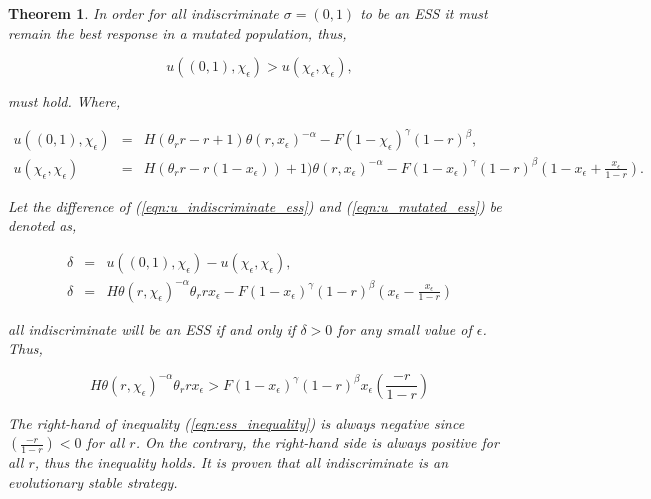 \documentclass[10pt]{article}
\newtheorem{theorem}{Theorem}
\begin{document}
\begin{theorem}
	In order for all indiscriminate \(\sigma=(0,1)\) to be an ESS it must
	remain the best response in a mutated population, thus,

	\begin{equation}\label{eqn:evolutionary_stability}
		u((0, 1), \chi_\epsilon) > u(\chi_\epsilon, \chi_\epsilon),
	\end{equation}

	must hold. Where, 

	\begin{eqnarray}
		\label{eqn:u_indiscriminate_ess}
		u((0, 1), \chi_\epsilon)  &=& H(\theta_rr - r + 1)\theta(r, x_\epsilon) ^{-\alpha}
		- F(1 - \chi_\epsilon) ^ {\gamma} (1- r) ^ {\beta},
		\\
		\label{eqn:u_mutated_ess}
		u(\chi_\epsilon, \chi_\epsilon) &=& H(\theta_rr - r(1 - x_\epsilon))+ 1)\theta(r,
		x_\epsilon) ^{-\alpha} - F(1 - x_\epsilon) ^ {\gamma} (1- r) ^ {\beta}(1 - 
		x_\epsilon + \frac{x_\epsilon}{1- r}).
\end{eqnarray}

	Let the difference of (\ref{eqn:u_indiscriminate_ess}) and (\ref{eqn:u_mutated_ess})
	be denoted as, 

	\begin{eqnarray}
		\label{eqn:delta}
	 	\delta &=& u((0, 1), \chi_\epsilon) - u(\chi_\epsilon, \chi_\epsilon),
	 	\\
	 	\label{eqn:sub_to_delta}
	 	\delta &=& H\theta(r, \chi_\epsilon) ^{-\alpha} \theta_r r x_\epsilon -
	 	F(1 - x_\epsilon) ^ {\gamma} (1- r) ^ {\beta}(x_\epsilon - \frac{x_\epsilon}{1- r})
	\end{eqnarray}

	all indiscriminate will be an ESS if and only if \(\delta >0 \) for any small 
	value of \(\epsilon\). Thus,

	\begin{equation}
	\label{eqn:ess_inequality}
		H\theta(r, \chi_\epsilon) ^{-\alpha} \theta_r r x_\epsilon > F
	 	(1 - x_\epsilon) ^ {\gamma} (1- r) ^ {\beta} x_\epsilon(\frac{-r}{1- r})
	\end{equation}

	The right-hand of inequality (\ref{eqn:ess_inequality}) is always negative
	since \((\frac{-r}{1- r}) < 0\)  for all \(r\). On the contrary, the right-hand 
	side is always positive for all \(r\), thus the inequality holds. 
	It is proven that all indiscriminate is an evolutionary stable strategy.
\end{theorem}
\end{document}
